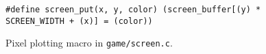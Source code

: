 \begin{figure}[ht]
\centering
\lstset{language=C,basicstyle=\ttfamily,numbers=left,firstnumber=27,breaklines=true}
\begin{lstlisting}
#define screen_put(x, y, color) (screen_buffer[(y) * SCREEN_WIDTH + (x)] = (color))
\end{lstlisting}
\caption{Pixel plotting macro in \texttt{game/screen.c}.}
\label{lst:screen_put}
\end{figure}
